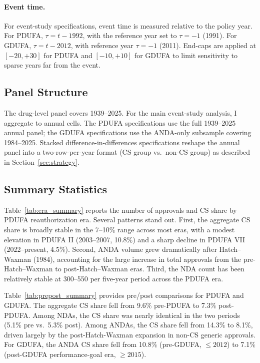 \paragraph{Event time.}
For event-study specifications, event time is measured relative to the policy year. For PDUFA, $\tau = t - 1992$, with the reference year set to $\tau = -1$ (1991). For GDUFA, $\tau = t - 2012$, with reference year $\tau = -1$ (2011). End-caps are applied at $[-20, +30]$ for PDUFA and $[-10, +10]$ for GDUFA to limit sensitivity to sparse years far from the event.

\subsection{Panel Structure}

The drug-level panel covers 1939--2025. For the main event-study analysis, I aggregate to annual cells. The PDUFA specifications use the full 1939--2025 annual panel; the GDUFA specifications use the ANDA-only subsample covering 1984--2025. Stacked difference-in-differences specifications reshape the annual panel into a two-row-per-year format (CS group vs.\ non-CS group) as described in Section~\ref{sec:strategy}.

\subsection{Summary Statistics}

Table~\ref{tab:era_summary} reports the number of approvals and CS share by PDUFA reauthorization era. Several patterns stand out. First, the aggregate CS share is broadly stable in the 7--10\% range across most eras, with a modest elevation in PDUFA II (2003--2007, 10.8\%) and a sharp decline in PDUFA VII (2022--present, 4.5\%). Second, ANDA volume grew dramatically after Hatch--Waxman (1984), accounting for the large increase in total approvals from the pre-Hatch--Waxman to post-Hatch--Waxman eras. Third, the NDA count has been relatively stable at 300--550 per five-year period across the PDUFA era.

Table~\ref{tab:prepost_summary} provides pre/post comparisons for PDUFA and GDUFA. The aggregate CS share fell from 9.6\% pre-PDUFA to 7.3\% post-PDUFA. Among NDAs, the CS share was nearly identical in the two periods (5.1\% pre vs.\ 5.3\% post). Among ANDAs, the CS share fell from 14.3\% to 8.1\%, driven largely by the post-Hatch-Waxman expansion in non-CS generic approvals. For GDUFA, the ANDA CS share fell from 10.8\% (pre-GDUFA, $\leq 2012$) to 7.1\% (post-GDUFA performance-goal era, $\geq 2015$).

